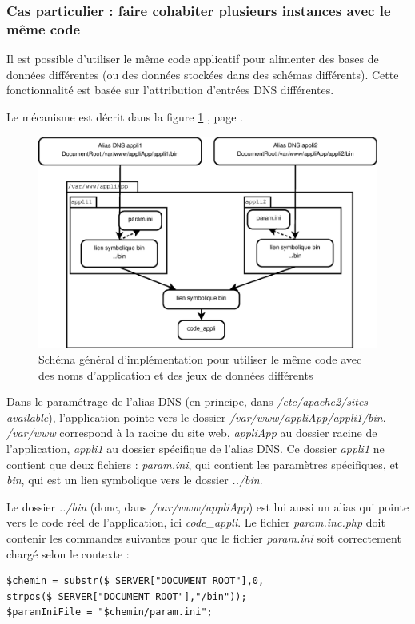 \subsubsection{Cas particulier : faire cohabiter plusieurs instances avec le même code}
\label{dnsmultiple}
Il est possible d'utiliser le même code applicatif pour alimenter des bases de données différentes (ou des données stockées dans des schémas différents). Cette fonctionnalité est basée sur l'attribution d'entrées DNS différentes. 

Le mécanisme est décrit dans la figure \ref{dnsmultipleschema} \textit{}, page \pageref{dnsmultipleschema}.

\begin{figure}[H]
\includegraphics[width=\linewidth]{images/dnsmultiple}
\caption{\label{dnsmultipleschema}Schéma général d’implémentation pour utiliser le même code avec des noms d’application et des jeux de données différents}
\end{figure}

Dans le paramétrage de l’alias DNS (en principe, dans \textit{/etc/apache2/sites-available}), l’application pointe vers le dossier \textit{/var/www/appliApp/appli1/bin}. \textit{/var/www} correspond à la racine du site web, \textit{appliApp} au dossier racine de l’application, \textit{appli1} au dossier spécifique de l’alias DNS. Ce dossier \textit{appli1} ne contient que deux fichiers : \textit{param.ini}, qui contient les paramètres spécifiques, et \textit{bin}, qui est un lien symbolique vers le dossier \textit{../bin}.

Le dossier \textit{../bin} (donc, dans\textit{ /var/www/appliApp}) est lui aussi un alias qui pointe vers le code réel de l’application, ici \textit{code\_appli}. Le fichier \textit{param.inc.php} doit contenir les commandes suivantes pour que le fichier \textit{param.ini} soit correctement chargé selon le contexte :
\begin{lstlisting}
$chemin = substr($_SERVER["DOCUMENT_ROOT"],0, strpos($_SERVER["DOCUMENT_ROOT"],"/bin"));
$paramIniFile = "$chemin/param.ini";
\end{lstlisting}

